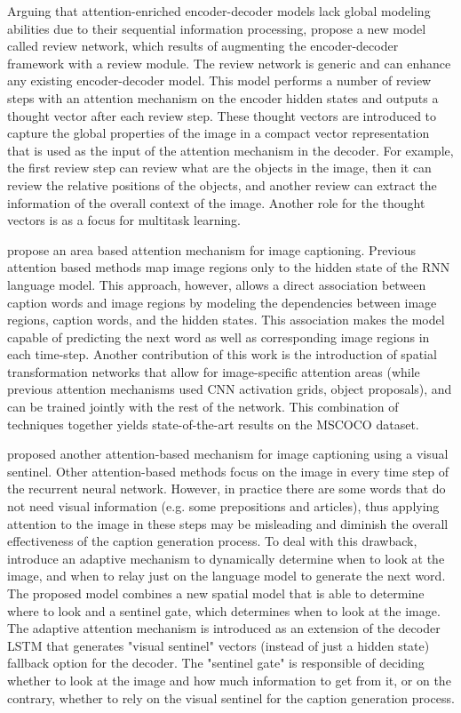 Arguing that attention-enriched encoder-decoder models lack global modeling abilities due to their sequential information processing, \citet{Yang2016_RevNet} propose a new model called review network, which results of augmenting the encoder-decoder framework with a review module. The review network is generic and can enhance any existing encoder-decoder model.
This model performs a number of review steps with an attention mechanism on the encoder hidden states and outputs a thought vector after each review step. These thought vectors are introduced to capture the global properties of the image in a compact vector representation that is used as the input of the attention mechanism in the decoder. For example, the first review step can review what are the objects in the image, then it can review the relative positions of the objects, and another review can extract the information of the overall context of the image. Another role for the thought vectors is as a focus for multitask learning.

\citet{Pedersoli2017} propose an area based attention mechanism for image captioning. Previous attention based methods map image regions only to the hidden state of the RNN language model. This approach, however, allows a direct association between caption words and image regions by modeling the dependencies between image regions, caption words, and the hidden states. This association makes the model capable of predicting the next word as well as corresponding image regions in each time-step. Another contribution of this work is the introduction of spatial transformation networks that allow for image-specific attention areas (while previous attention mechanisms used CNN activation grids, object proposals), and can be trained jointly with the rest of the network. This combination of techniques together yields state-of-the-art results on the MSCOCO dataset.

\citet{Lu2017} proposed another attention-based mechanism for image captioning using a visual sentinel. Other attention-based methods focus on the image in every time step of the recurrent neural network. However, in practice there are some words that do not need visual information (e.g. some prepositions and articles), thus applying attention to the image in these steps may be misleading and diminish the overall effectiveness of the caption generation process. To deal with this drawback, \citeauthor{Lu2017} introduce an adaptive mechanism to dynamically determine when to look at the image, and when to relay just on the language model to generate the next word. The proposed model combines a new spatial model that is able to determine where to look and a sentinel gate, which determines when to look at the image. The adaptive attention mechanism is introduced as an extension of the decoder LSTM that generates "visual sentinel" vectors (instead of just a hidden state) fallback option for the decoder. The "sentinel gate" is responsible of deciding whether to look at the image and how much information to get from it, or on the contrary, whether to rely on the visual sentinel for the caption generation process.

